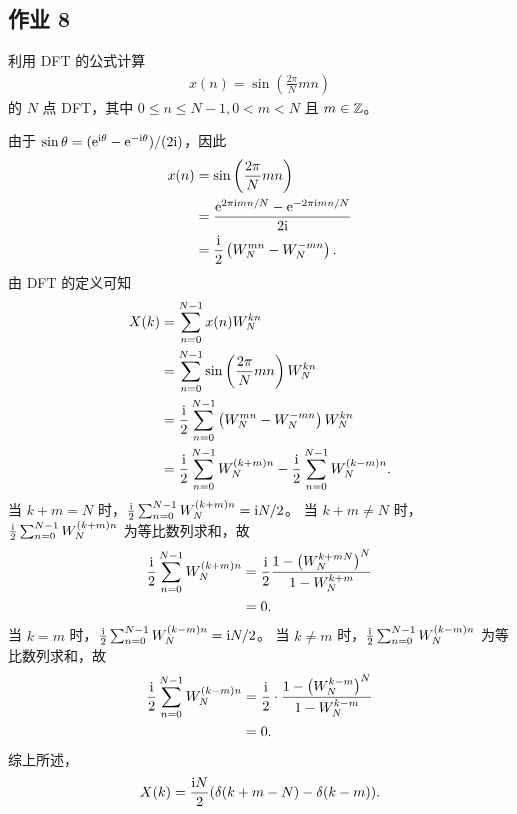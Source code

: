 \subsection{作业 8}

\begin{homework}
    利用 DFT 的公式计算
    \begin{align*}
        x(n) = \sin\left(\frac{2\pi}{N}mn\right)
    \end{align*}
    的 $N$ 点 DFT，其中 $0 \le n \le N - 1, 0 < m < N$ 且 $m \in \mathbb{Z}$。
\end{homework}

\begin{solution}
    由于 $\sin\theta = (\mathrm{e}^{\mathrm{i}\theta} - \mathrm{e}^{-\mathrm{i}\theta})/(2\mathrm{i})$，因此
    \begin{align*}
        x(n) & = \sin\left(\frac{2\pi}{N}mn\right) \\
        & = \frac{\mathrm{e}^{2\pi\mathrm{i} mn/N} - \mathrm{e}^{-2\pi\mathrm{i} mn/N}}{2\mathrm{i}} \\
        & = \frac{\mathrm{i}}{2} \left(W_N^{mn} - W_N^{-mn}\right).
    \end{align*}
    由 DFT 的定义可知
    \begin{align*}
        X(k) & = \sum_{n = 0}^{N - 1} x(n)W_N^{kn} \\
        & = \sum_{n = 0}^{N - 1} \sin\left(\frac{2\pi}{N}mn\right)W_N^{kn} \\
        & = \frac{\mathrm{i}}{2}\sum_{n = 0}^{N - 1}\left(W_N^{mn} - W_N^{-mn}\right)W_N^{kn} \\
        & = \frac{\mathrm{i}}{2}\sum_{n = 0}^{N - 1}W_N^{(k + m)n} - \frac{\mathrm{i}}{2}\sum_{n = 0}^{N - 1}W_N^{(k - m)n}.
    \end{align*}
    当 $k + m = N$ 时，$\frac{\mathrm{i}}{2}\sum_{n = 0}^{N - 1}W_N^{(k + m)n} = \mathrm{i} N / 2$。
    当 $k + m \neq N$ 时，$\frac{\mathrm{i}}{2}\sum_{n = 0}^{N - 1}W_N^{(k + m)n}$ 为等比数列求和，故
    \begin{align*}
        \frac{\mathrm{i}}{2}\sum_{n = 0}^{N - 1}W_N^{(k + m)n} & = \frac{\mathrm{i}}{2}\frac{1 - \left(W_N^{k + mN}\right)^N}{1 - W_N^{k + m}} \\
        & = 0.
    \end{align*}
    当 $k = m$ 时，$\frac{\mathrm{i}}{2}\sum_{n = 0}^{N - 1}W_N^{(k - m)n} = \mathrm{i} N / 2$。
    当 $k \ne m$ 时，$\frac{\mathrm{i}}{2}\sum_{n = 0}^{N - 1}W_N^{(k - m)n}$ 为等比数列求和，故
    \begin{align*}
        \frac{\mathrm{i}}{2}\sum_{n = 0}^{N - 1}W_N^{(k - m)n} & = \frac{\mathrm{i}}{2} \cdot \frac{1 - \left(W_N^{k - m}\right)^N}{1 - W_N^{k - m}} \\
        & = 0.
    \end{align*}
    综上所述，
    \begin{align*}
        X(k) = \frac{\mathrm{i} N}{2}(\delta(k + m - N) - \delta(k - m)).
    \end{align*}
\end{solution}

